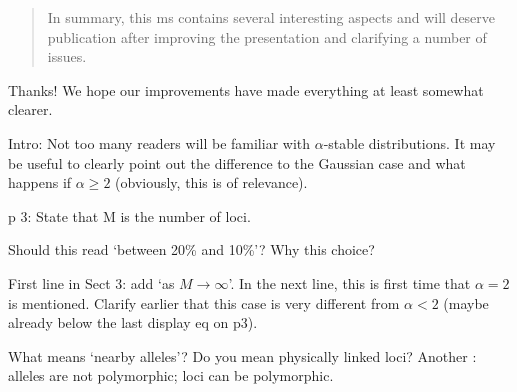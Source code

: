 \begin{quote}
In summary, this ms contains several interesting aspects and will deserve publication after
improving the presentation and clarifying a number of issues.
\end{quote}

Thanks! We hope our improvements
have made everything at least somewhat clearer.


\begin{point}{}
Intro: Not too many readers will be familiar with $\alpha$-stable distributions. It may be
useful to clearly point out the difference to the Gaussian case and what happens if $\alpha \ge 2$
(obviously, this is of relevance).
\end{point}


\begin{point}{}
p 3: State that M is the number of loci.
\end{point}


\begin{point}{\revref}
Should this read ‘between 20\% and 10\%’? Why this choice?
\end{point}


\begin{point}{\revref}
First line in Sect 3: add ‘as $M \to \infty$’. In the next line, this is first time that $\alpha = 2$ is
mentioned. Clarify earlier that this case is very different from $\alpha < 2$ (maybe already below
the last display eq on p3).
\end{point}


\begin{point}{\revref}
What means `nearby alleles'? Do you mean physically linked
    loci? Another : alleles are not polymorphic; loci can be polymorphic.
\end{point}

